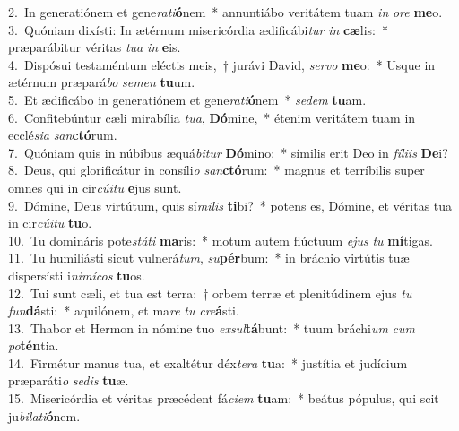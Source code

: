 {2.~}In generatiónem et gene\textit{ra}\textit{ti}\textbf{ó}nem~* annuntiábo veritátem tuam \textit{in} \textit{o}\textit{re} \textbf{me}o.\\
{3.~}Quóniam dixísti: In ætérnum misericórdia ædificábi\textit{tur} \textit{in} \textbf{cæ}lis:~* præparábitur véritas \textit{tu}\textit{a} \textit{in} \textbf{e}is.\\
{4.~}Dispósui testaméntum eléctis meis,~† jurávi David, \textit{ser}\textit{vo} \textbf{me}o:~* Usque in ætérnum præpará\textit{bo} \textit{se}\textit{men} \textbf{tu}um.\\
{5.~}Et ædificábo in generatiónem et gene\textit{ra}\textit{ti}\textbf{ó}nem~* \textit{se}\textit{dem} \textbf{tu}am.\\
{6.~}Confitebúntur cæli mirabília \textit{tu}\textit{a}, \textbf{Dó}mine,~* étenim veritátem tuam in ecclé\textit{si}\textit{a} \textit{san}\textbf{ctó}rum.\\
{7.~}Quóniam quis in núbibus æquá\textit{bi}\textit{tur} \textbf{Dó}mino:~* símilis erit Deo in \textit{fí}\textit{li}\textit{is} \textbf{De}i?\\
{8.~}Deus, qui glorificátur in consíli\textit{o} \textit{san}\textbf{ctó}rum:~* magnus et terríbilis super omnes qui in cir\textit{cú}\textit{i}\textit{tu} \textbf{e}jus sunt.\\
{9.~}Dómine, Deus virtútum, quis sí\textit{mi}\textit{lis} \textbf{ti}bi?~* potens es, Dómine, et véritas tua in cir\textit{cú}\textit{i}\textit{tu} \textbf{tu}o.\\
{10.~}Tu domináris pote\textit{stá}\textit{ti} \textbf{ma}ris:~* motum autem flúctuum \textit{e}\textit{jus} \textit{tu} \textbf{mí}tigas.\\
{11.~}Tu humiliásti sicut vulnerá\textit{tum}, \textit{su}\textbf{pér}bum:~* in bráchio virtútis tuæ dispersísti i\textit{ni}\textit{mí}\textit{cos} \textbf{tu}os.\\
{12.~}Tui sunt cæli, et tua est terra:~† orbem terræ et plenitúdinem ejus \textit{tu} \textit{fun}\textbf{dá}sti:~* aquilónem, et ma\textit{re} \textit{tu} \textit{cre}\textbf{á}sti.\\
{13.~}Thabor et Hermon in nómine tuo \textit{ex}\textit{sul}\textbf{tá}bunt:~* tuum bráchi\textit{um} \textit{cum} \textit{po}\textbf{tén}tia.\\
{14.~}Firmétur manus tua, et exaltétur déx\textit{te}\textit{ra} \textbf{tu}a:~* justítia et judícium præparáti\textit{o} \textit{se}\textit{dis} \textbf{tu}æ.\\
{15.~}Misericórdia et véritas præcédent fá\textit{ci}\textit{em} \textbf{tu}am:~* beátus pópulus, qui scit ju\textit{bi}\textit{la}\textit{ti}\textbf{ó}nem.\\
